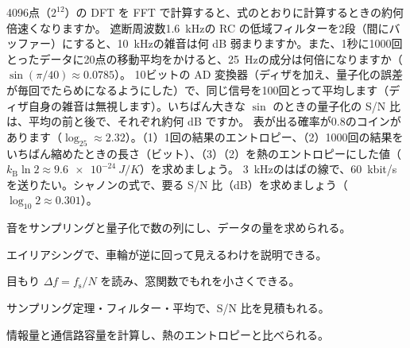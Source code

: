 \bkproblem 4096点（$2^{12}$）の DFT を FFT で計算すると、式のとおりに計算するときの約何倍速くなりますか。
\bkproblem 遮断周波数\qty{1.6}{kHz}の RC の低域フィルターを2段（間にバッファー）にすると、\qty{10}{kHz}の雑音は何 dB 弱まりますか。また、1秒に1000回とったデータに20点の移動平均をかけると、\qty{25}{Hz}の成分は何倍になりますか（$\sin(\pi/40)\approx0.0785$）。
\bkproblem 10ビットの AD 変換器（ディザを加え、量子化の誤差が毎回でたらめになるようにした）で、同じ信号を100回とって平均します（ディザ自身の雑音は無視します）。いちばん大きな $\sin$ のときの量子化の S/N 比は、平均の前と後で、それぞれ約何 dB ですか。
\bkproblem 表が出る確率が0.8のコインがあります（$\log_25\approx2.32$）。（1）1回の結果のエントロピー、（2）1000回の結果をいちばん縮めたときの長さ（ビット）、（3）（2）を熱のエントロピーにした値（$k_{\mathrm B}\ln2\approx\qty{9.6e-24}{J/K}$）を求めましょう。
\bkproblem \qty{3}{kHz}のはばの線で、\qty{60}{kbit/s}を送りたい。シャノンの式で、要る S/N 比（dB）を求めましょう（$\log_{10}2\approx0.301$）。

\begin{furikaeri}
\begin{checklist}
\item 音をサンプリングと量子化で数の列にし、データの量を求められる。
\item エイリアシングで、車輪が逆に回って見えるわけを説明できる。
\item 目もり $\Delta f=f_{\mathrm s}/N$ を読み、窓関数でもれを小さくできる。
\item サンプリング定理・フィルター・平均で、S/N 比を見積もれる。
\item 情報量と通信路容量を計算し、熱のエントロピーと比べられる。
\end{checklist}
\end{furikaeri}
